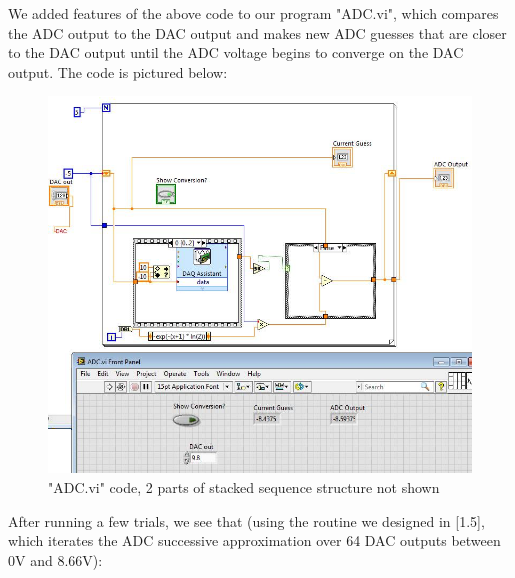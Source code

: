 \documentclass{article}
\begin{document}
    We added features of the above code to our program "ADC.vi", which compares the ADC output to the DAC output and makes new ADC guesses that are closer to the DAC output until the ADC voltage begins to converge on the DAC output. The code is pictured below:
    \begin{figure}[H]
        \centering
        \includegraphics[scale = 0.5]{4c.png}
        \caption{"ADC.vi" code, 2 parts of stacked sequence structure not shown \cite{lab10}}
        \label{fig:my_label}
    \end{figure}
    After running a few trials, we see that (using the routine we designed in [1.5], which iterates the ADC successive approximation over 64 DAC outputs between 0V and 8.66V): 
\end{document}
